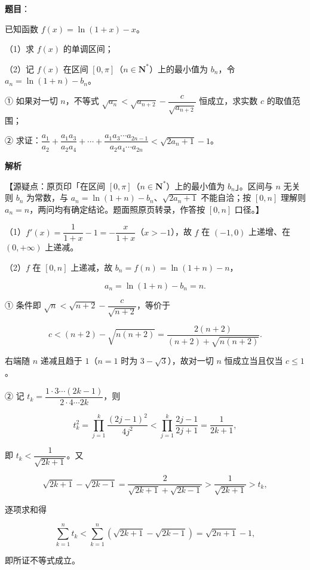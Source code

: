 \begin{answer}

\textbf{题目}：

已知函数 $f(x)=\ln(1+x)-x$。

（1）求 $f(x)$ 的单调区间；

（2）记 $f(x)$ 在区间 $[0,\pi]$（$n\in\mathbf N^*$）上的最小值为 $b_n$，令 $a_n=\ln(1+n)-b_n$。

① 如果对一切 $n$，不等式 $\sqrt{a_n}<\sqrt{a_{n+2}}-\dfrac{c}{\sqrt{a_{n+2}}}$ 恒成立，求实数 $c$ 的取值范围；

② 求证：$\dfrac{a_1}{a_2}+\dfrac{a_1a_3}{a_2a_4}+\cdots+\dfrac{a_1a_3\cdots a_{2n-1}}{a_2a_4\cdots a_{2n}}<\sqrt{2a_n+1}-1$。

\textbf{解析}

【源疑点：原页印「在区间 $[0,\pi]$（$n\in\mathbf N^*$）上的最小值为 $b_n$」。区间与 $n$ 无关则 $b_n$ 为常数，与 $a_n=\ln(1+n)-b_n$、$\sqrt{2a_n+1}$ 不能自洽；按 $[0,n]$ 理解则 $a_n=n$，两问均有确定结论。题面照原页转录，作答按 $[0,n]$ 口径。】

（1）$f'(x)=\dfrac1{1+x}-1=-\dfrac x{1+x}$（$x>-1$），故 $f$ 在 $(-1,0)$ 上递增、在 $(0,+\infty)$ 上递减。

（2）$f$ 在 $[0,n]$ 上递减，故 $b_n=f(n)=\ln(1+n)-n$，

\nopagebreak[4]
\[a_n=\ln(1+n)-b_n=n.\]

① 条件即 $\sqrt n<\sqrt{n+2}-\dfrac c{\sqrt{n+2}}$，等价于

\nopagebreak[4]
\[c<(n+2)-\sqrt{n(n+2)}=\frac{2(n+2)}{(n+2)+\sqrt{n(n+2)}}.\]

右端随 $n$ 递减且趋于 $1$（$n=1$ 时为 $3-\sqrt3$），故对一切 $n$ 恒成立当且仅当 $c\leqslant1$。

② 记 $t_k=\dfrac{1\cdot3\cdots(2k-1)}{2\cdot4\cdots2k}$，则

\nopagebreak[4]
\[t_k^2=\prod_{j=1}^k\frac{(2j-1)^2}{4j^2}<\prod_{j=1}^k\frac{2j-1}{2j+1}=\frac1{2k+1},\]

即 $t_k<\dfrac1{\sqrt{2k+1}}$。又

\nopagebreak[4]
\[\sqrt{2k+1}-\sqrt{2k-1}=\frac2{\sqrt{2k+1}+\sqrt{2k-1}}>\frac1{\sqrt{2k+1}}>t_k,\]

逐项求和得

\nopagebreak[4]
\[\sum_{k=1}^n t_k<\sum_{k=1}^n\left(\sqrt{2k+1}-\sqrt{2k-1}\right)=\sqrt{2n+1}-1,\]

即所证不等式成立。


\end{answer}